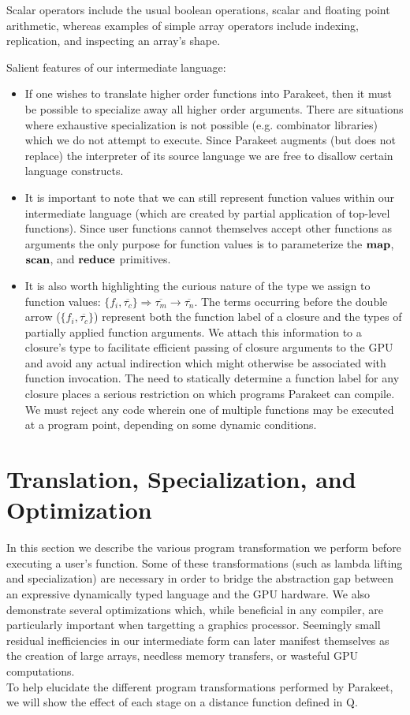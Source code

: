 \documentclass[preprint]{sigplanconf}
\begin{document}
Scalar operators include the usual boolean operations, scalar and floating point arithmetic, whereas examples of simple array operators include indexing, replication, and inspecting an array's shape. 

Salient features of our intermediate language: 
\begin{itemize}
\item If one wishes to translate higher order functions into Parakeet, then it must be possible to specialize away all higher order arguments. 
There are situations where exhaustive specialization is not possible (e.g. combinator libraries) which we do not attempt to execute. Since Parakeet augments (but does not replace) the interpreter of its source language we are free to disallow certain language constructs. 

\item It is important to note that we can still represent function values within our intermediate language (which are created by partial application of top-level functions). Since user functions cannot themselves accept other functions as arguments the only purpose for function values is to parameterize the $\mbox{\textbf{map}}$, $\mbox{\textbf{scan}}$, and $\mbox{\textbf{reduce}}$ primitives. 

\item It is also worth highlighting the curious nature of the type we assign to function values: 
$ \{ f_i, \overline{\tau_{c}} \} \Rightarrow \overline{\tau_m} \rightarrow \overline{\tau_n}$.  The terms occurring before the double arrow ($\{f_i, \overline{\tau_{c}} \}$) represent both the function label of a closure and the types of partially applied function arguments. We attach this information to a closure's type to facilitate efficient passing of closure arguments to the GPU and avoid any actual indirection which might otherwise be associated with function invocation. The need to statically determine a function label for any closure places a serious restriction on which programs Parakeet can compile. We must reject any code wherein one of multiple functions may be executed at a program point, depending on some dynamic conditions. 
\end{itemize} 


\section{Translation, Specialization, and Optimization}
\label{Compilation}
In this section we describe the various program transformation we perform before executing a user's function. 
Some of these transformations (such as lambda lifting and specialization) are necessary in order to bridge the 
abstraction gap between an expressive dynamically typed language and the GPU hardware. 
We also demonstrate several optimizations which, while beneficial in any compiler, are particularly important when targetting a graphics processor. 
Seemingly small residual inefficiencies in our intermediate form can later manifest themselves as the creation of large arrays, needless memory transfers, or wasteful GPU computations. 
\\
To help elucidate the different program transformations performed by Parakeet, we will show the effect of each stage on a distance function defined in Q. 
 
\end{document}

